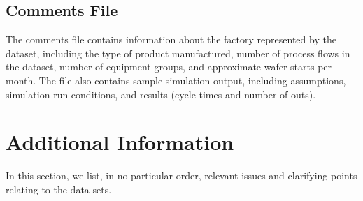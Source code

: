   \subsection{Comments File}
   The comments file contains information about the factory represented 
   by the dataset, including the type of product manufactured, 
   number of process flows
   in the dataset, number of equipment groups, and approximate wafer starts
   per month. The file also contains sample simulation output, including  
   assumptions, simulation run conditions, and results (cycle times and 
   number of outs).




 
   \newpage
   \section{Additional Information}
   
   In this section, we list, in no particular order,
   relevant issues and clarifying points
   relating to the data sets.
   
